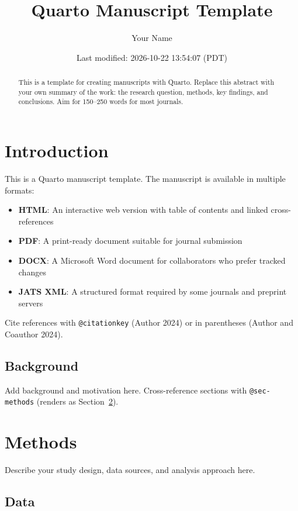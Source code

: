 \documentclass[
  letterpaper,
  DIV=11,
  numbers=noendperiod]{scrartcl}
\title{Quarto Manuscript Template}
\author{Your Name}
\date{Last modified: 2026-10-22 13:54:07 (PDT)}
\providecommand{\tightlist}{%
  \setlength{\itemsep}{0pt}\setlength{\parskip}{0pt}}
\begin{document}
\maketitle
\begin{abstract}
This is a template for creating manuscripts with Quarto. Replace this
abstract with your own summary of the work: the research question,
methods, key findings, and conclusions. Aim for 150--250 words for most
journals.
\end{abstract}


\section{Introduction}\label{sec-intro}

This is a Quarto manuscript template. The manuscript is available in
multiple formats:

\begin{itemize}
\tightlist
\item
  \textbf{HTML}: An interactive web version with table of contents and
  linked cross-references
\item
  \textbf{PDF}: A print-ready document suitable for journal submission
\item
  \textbf{DOCX}: A Microsoft Word document for collaborators who prefer
  tracked changes
\item
  \textbf{JATS XML}: A structured format required by some journals and
  preprint servers
\end{itemize}

Cite references with \texttt{@citationkey} (Author 2024) or in
parentheses (Author and Coauthor 2024).

\subsection{Background}\label{background}

Add background and motivation here. Cross-reference sections with
\texttt{@sec-methods} (renders as Section~\ref{sec-methods}).

\section{Methods}\label{sec-methods}

Describe your study design, data sources, and analysis approach here.

\subsection{Data}\label{data}
\end{document}
